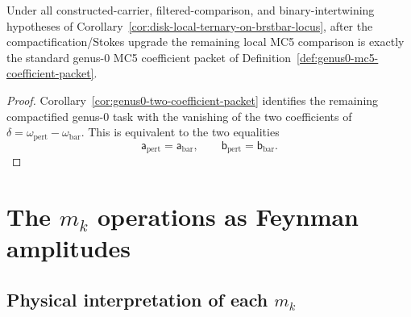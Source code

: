 \begin{corollary}
\label{cor:genus0-named-coefficient-packet}
Under all constructed-carrier, filtered-comparison, and binary-intertwining hypotheses of Corollary~\ref{cor:disk-local-ternary-on-brstbar-locus}, after the compactification/Stokes
upgrade the remaining local MC5 comparison is exactly the standard
genus-$0$ MC5 coefficient packet of
Definition~\ref{def:genus0-mc5-coefficient-packet}.
\end{corollary}

\begin{proof}
Corollary~\ref{cor:genus0-two-coefficient-packet} identifies the
remaining compactified genus-$0$ task with the vanishing of the two
coefficients of
\(\delta=\omega_{\mathrm{pert}}-\omega_{\mathrm{bar}}\).
This is equivalent to the two equalities
\[
\mathsf{a}_{\mathrm{pert}}=\mathsf{a}_{\mathrm{bar}},
\qquad
\mathsf{b}_{\mathrm{pert}}=\mathsf{b}_{\mathrm{bar}}.
\]
\end{proof}


\section{\texorpdfstring{The $m_k$ operations as Feynman amplitudes}{The m k operations as Feynman amplitudes}}
\label{sec:mk-feynman-complete}

\subsection{\texorpdfstring{Physical interpretation of each $m_k$}{Physical interpretation of each m k}}

